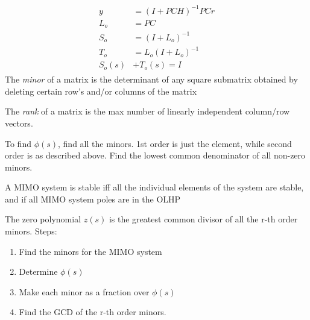 \documentclass[12pt]{article}
\begin{document}
\begin{multicols*}{2}
    \underline{}
    \begin{gather*}
        \begin{aligned}
            y      & = ( I + PCH )^{-1} PCr \\
            L_o    & = PC                   \\
            S_o    & = (I + L_o) ^ {-1}     \\
            T_o    & = L_o(I + L_o) ^ {-1}  \\
            S_o(s) & + T_o(s) = I
        \end{aligned}
    \end{gather*}
    The \textit{minor} of a matrix is the determinant of any square submatrix obtained by deleting certain row's and/or columns of the matrix

    The \textit{rank} of a matrix is the max number of linearly independent column/row vectors.

    To find \(\phi(s)\), find all the minors. 1st order is just the element, while second order is as described above. Find the lowest common denominator of all non-zero minors.

    A MIMO system is stable iff all the individual elements of the system are stable, and if all MIMO system poles are in the OLHP

    The zero polynomial \(z(s)\) is the greatest common divisor of all the r-th order minors. Steps:
    \begin{enumerate}
        \item Find the minors for the MIMO system
        \item Determine \(\phi(s)\)
        \item Make each minor as a fraction over \(\phi(s)\)
        \item Find the GCD of the r-th order minors.
    \end{enumerate}

\end{multicols*}
\end{document}
